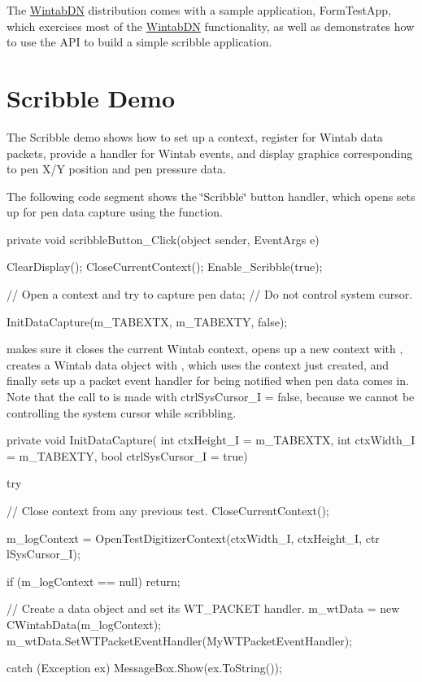 The \hyperlink{namespace_wintab_d_n}{WintabDN} distribution comes with a sample application, FormTestApp, which exercises most of the \hyperlink{namespace_wintab_d_n}{WintabDN} functionality, as well as demonstrates how to use the API to build a simple scribble application.\hypertarget{page2_scribbleDemo_sec}{}\section{Scribble Demo}\label{page2_scribbleDemo_sec}
The Scribble demo shows how to set up a context, register for Wintab data packets, provide a handler for Wintab events, and display graphics corresponding to pen X/Y position and pen pressure data.

The following code segment shows the \char`\"{}Scribble\char`\"{} button handler, which opens sets up for pen data capture using the {} function. 
\begin{DoxyCode}
    private void scribbleButton_Click(object sender, EventArgs e)
    {
        ClearDisplay();
        CloseCurrentContext();
        Enable_Scribble(true);

        // Open a context and try to capture pen data;
        // Do not control system cursor.

        InitDataCapture(m_TABEXTX, m_TABEXTY, false);
    }
\end{DoxyCode}


{} makes sure it closes the current Wintab context, opens up a new context with {}, creates a Wintab data object with {}, which uses the context just created, and finally sets up a packet event handler for being notified when pen data comes in. Note that the call to {} is made with ctrlSysCursor\_\-I = false, because we cannot be controlling the system cursor while scribbling.


\begin{DoxyCode}
    private void InitDataCapture(
    int ctxHeight_I = m_TABEXTX, int ctxWidth_I = m_TABEXTY, bool ctrlSysCursor_I
       = true)
    {
        try
        {
            // Close context from any previous test.
            CloseCurrentContext();

            m_logContext = OpenTestDigitizerContext(ctxWidth_I, ctxHeight_I,  ctr
      lSysCursor_I);

            if (m_logContext == null)
            {
                return;
            }

            // Create a data object and set its WT_PACKET handler.
            m_wtData = new CWintabData(m_logContext);
            m_wtData.SetWTPacketEventHandler(MyWTPacketEventHandler);
        }
        catch (Exception ex)
        {
            MessageBox.Show(ex.ToString());
        }
    }
\end{DoxyCode}


